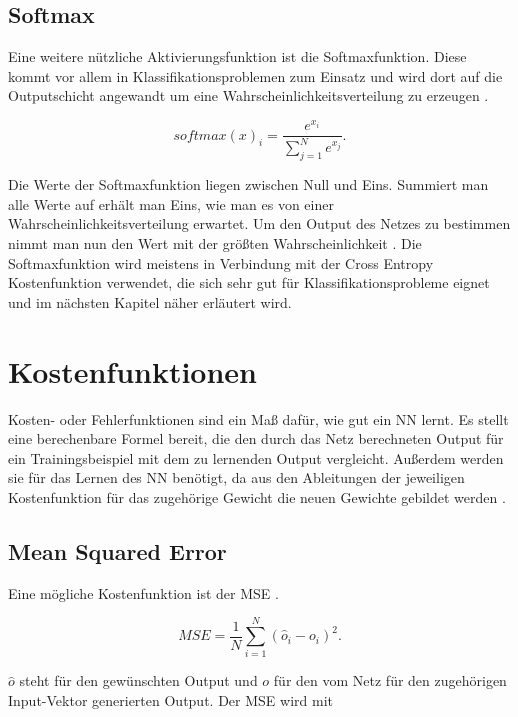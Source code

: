 \subsection{Softmax}\label{softmax}
Eine weitere nützliche Aktivierungsfunktion ist die Softmaxfunktion. Diese kommt vor allem in Klassifikationsproblemen zum Einsatz und wird dort auf die Outputschicht angewandt um eine Wahrscheinlichkeitsverteilung zu erzeugen \cite{Goodfellow}.

\begin{equation}
softmax(x)_i=\frac{e^{x_i}}{\sum_{j=1}^{N}e^{x_j}}.
\end{equation}


Die Werte der Softmaxfunktion liegen zwischen Null und Eins. Summiert man alle Werte auf erhält man Eins, wie man es von einer Wahrscheinlichkeitsverteilung erwartet. Um den Output des Netzes zu bestimmen nimmt man nun den Wert mit der größten Wahrscheinlichkeit \cite{handson}. Die Softmaxfunktion wird meistens in Verbindung mit der Cross Entropy Kostenfunktion verwendet, die sich sehr gut für Klassifikationsprobleme eignet und im nächsten Kapitel näher erläutert wird.



\section{Kostenfunktionen}
Kosten- oder Fehlerfunktionen sind ein Maß daf\"ur, wie gut ein \gls{NN} lernt. Es stellt eine berechenbare Formel bereit, die den durch das Netz berechneten Output f\"ur ein Trainingsbeispiel mit dem zu lernenden Output vergleicht. Au\ss erdem werden sie f\"ur das Lernen des \gls{NN} ben\"otigt, da aus den Ableitungen der jeweiligen Kostenfunktion f\"ur das zugeh\"orige Gewicht die neuen Gewichte gebildet werden \cite{Goodfellow}.




\subsection{Mean Squared Error}
Eine m\"ogliche Kostenfunktion ist der \gls{MSE} \cite{Rojas1996}.

\begin{equation}
MSE=\frac{1}{N}\sum_{i=1}^{N} (\hat{o}_i-o_i)^2.
\end{equation}

$\hat{o}$ steht f\"ur den gew\"unschten Output und $o$ f\"ur den vom Netz f\"ur den zugeh\"origen Input-Vektor generierten Output.
Der \gls{MSE} wird mit \cite{cookbook}

